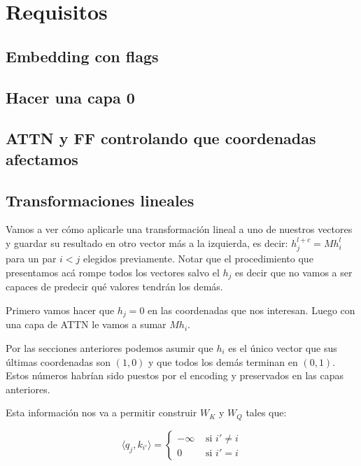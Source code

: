 \section*{Requisitos}

\subsection*{Embedding con flags}


\subsection*{Hacer una capa 0}


\subsection*{ATTN y FF controlando que coordenadas afectamos}

\subsection*{Transformaciones lineales}
Vamos a ver cómo aplicarle una transformación lineal a uno de nuestros vectores y guardar su resultado en otro vector más a la izquierda, es decir: $h_j^{l+c} = M h_i^l$ para un par $i < j$ elegidos previamente. Notar que el procedimiento que presentamos acá rompe todos los vectores salvo el $h_j$ es decir que no vamos a ser capaces de predecir qué valores tendrán los demás. 

\bigskip

Primero vamos hacer que $h_j = 0$ en las coordenadas que nos interesan. Luego con una capa de ATTN le vamos a sumar $M h_i$.

Por las secciones anteriores podemos asumir que $h_i$ es el único vector que sus últimas coordenadas son $(1,0)$ y que todos los demás terminan en $(0,1)$. Estos números habrían sido puestos por el encoding y preservados en las capas anteriores.

Esta información nos va a permitir construir $W_K$ y $W_Q$ tales que:

\[
\langle q_{j}, k_{i'} \rangle = \begin{cases}
    -\infty &\text{ si } i' \neq i \\
    0  &\text{ si } i' = i 
\end{cases}
\]

